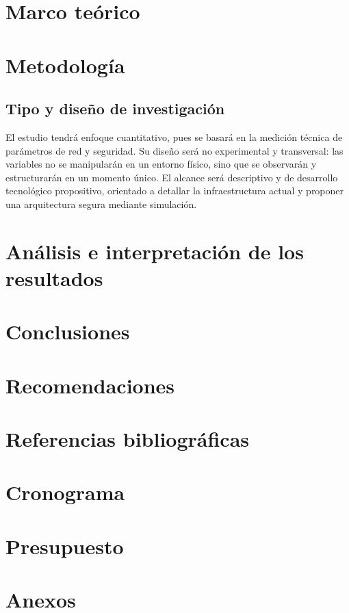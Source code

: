 \documentclass[11pt,letterpaper]{article}
\begin{document}
\section{Marco teórico}

\section{Metodología}
\subsection{Tipo y diseño de investigación}
El estudio tendrá enfoque cuantitativo, pues se basará en la medición técnica de
parámetros de red y seguridad. Su diseño será no experimental y transversal: las
variables no se manipularán en un entorno físico, sino que se observarán y
estructurarán en un momento único. El alcance será descriptivo y de desarrollo
tecnológico propositivo, orientado a detallar la infraestructura actual y
proponer una arquitectura segura mediante simulación.

\section{Análisis e interpretación de los resultados}

\section{Conclusiones}

\section{Recomendaciones}

\section{Referencias bibliográficas}

\section{Cronograma}

\section{Presupuesto}

\section{Anexos}
\end{document}
